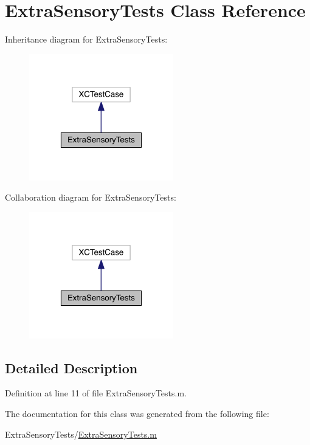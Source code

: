 \hypertarget{interface_extra_sensory_tests}{\section{Extra\+Sensory\+Tests Class Reference}
\label{interface_extra_sensory_tests}
}


Inheritance diagram for Extra\+Sensory\+Tests\+:\nopagebreak
\begin{figure}[H]
\begin{center}
\leavevmode
\includegraphics[width=178pt]{dc/da7/interface_extra_sensory_tests__inherit__graph}
\end{center}
\end{figure}


Collaboration diagram for Extra\+Sensory\+Tests\+:\nopagebreak
\begin{figure}[H]
\begin{center}
\leavevmode
\includegraphics[width=178pt]{dd/d06/interface_extra_sensory_tests__coll__graph}
\end{center}
\end{figure}


\subsection{Detailed Description}


Definition at line 11 of file Extra\+Sensory\+Tests.\+m.



The documentation for this class was generated from the following file\+:\begin{DoxyCompactItemize}
\item 
Extra\+Sensory\+Tests/\hyperlink{_extra_sensory_tests_8m}{Extra\+Sensory\+Tests.\+m}\end{DoxyCompactItemize}
